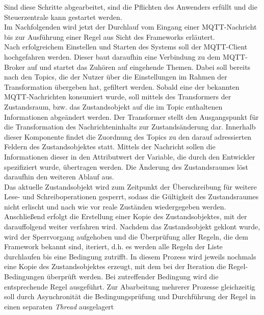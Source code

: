         Sind diese Schritte abgearbeitet, sind die Pflichten des Anwenders erfüllt und die Steuerzentrale kann gestartet werden. 
        \\
        Im Nachfolgenden wird jetzt der Durchlauf vom Eingang einer \acs{MQTT}-Nachricht bis zur Ausführung einer Regel aus Sicht des Frameworks 
        erläutert.
        \\
        \linebreak
        Nach erfolgreichem Einstellen und Starten des Systems soll der \acs{MQTT}-Client hochgefahren werden. Dieser baut daraufhin eine 
        Verbindung zu dem \acs{MQTT}-Broker auf und startet das Zuhören auf eingehende Themen. Dabei soll bereits nach den Topics,  
        die der Nutzer über die Einstellungen im Rahmen der Transformation übergeben hat, gefiltert werden. Sobald eine der bekannten 
        \acs{MQTT}-Nachrichten konsumiert wurde, soll mittels des Transformers der Zustandsraum, bzw. das Zustandsobjekt 
        auf die im Topic enthaltenen Informationen abgeändert werden. Der Transformer stellt den Ausgangspunkt für die Transformation 
        des Nachrichteninhalts zur Zustandsänderung dar. Innerhalb dieser Komponente findet die Zuordnung 
        des Topics zu den darauf adressierten Feldern des Zustandsobjektes statt. Mittels der Nachricht sollen die Informationen dieser 
        in den Attributwert der Variable, die durch den Entwickler spezifiziert wurde, übertragen werden. Die Änderung des 
        Zustandsraumes löst daraufhin den weiteren Ablauf aus. 
        \\
        Das aktuelle Zustandsobjekt wird zum Zeitpunkt der Überschreibung für weitere Lese- und Schreiboperationen gesperrt, sodass 
        die Gültigkeit des Zustandsraumes nicht erlischt und nach wie vor reale Zuständen wiedergegeben werden. Anschließend erfolgt die 
        Erstellung einer Kopie des Zustandsobjektes, mit der 
        darauffolgend weiter verfahren wird. Nachdem das Zustandsobjekt geklont wurde, wird der Sperrvorgang aufgehoben und die 
        Überprüfung aller Regeln, die dem Framework bekannt sind, iteriert, d.h. es werden alle Regeln der Liste durchlaufen bis eine Bedingung zutrifft. In diesem Prozess 
        wird jeweils nochmals eine Kopie des Zustandsobjektes erzeugt, mit dem bei der Iteration die Regel-Bedingungen überprüft werden. 
        Bei zutreffender Bedingung wird die entsprechende Regel ausgeführt. Zur Abarbeitung mehrerer Prozesse 
        gleichzeitig soll durch Asynchronität die Bedingungsprüfung und Durchführung der Regel in einen separaten \textit{Thread} ausgelagert 
